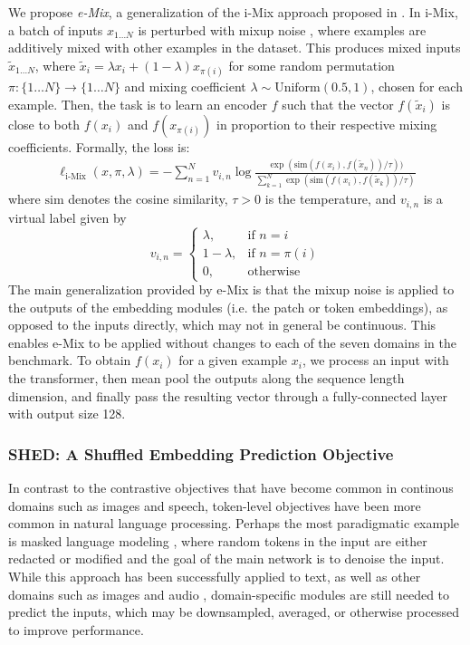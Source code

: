 \documentclass{article}
\begin{document}
We propose \emph{e-Mix}, a generalization of the i-Mix approach proposed in \citet{Lee2021iMIXAD}. In i-Mix, a batch of inputs $x_{1 \ldots N}$ is perturbed with mixup noise \citep{Zhang2018mixupBE}, where examples are additively mixed with other examples in the dataset. This produces mixed inputs $\tilde x_{1 \ldots N}$, where $\tilde x_{i} = \lambda x_i + (1 - \lambda) x_{\pi(i)}$ for some random permutation $\pi : \{1 \ldots N\} \rightarrow \{1 \ldots N\}$ and mixing coefficient $\lambda \sim \textrm{Uniform}(0.5, 1)$, chosen for each example. Then, the task is to learn an encoder $f$ such that the vector $f(\tilde x_i)$ is close to both $f(x_i)$ and $f(x_{\pi(i)})$ in proportion to their respective mixing coefficients. Formally, the loss is:
\begin{align}
    \ell_{\textrm{i-Mix}}(x, \pi, \lambda) = 
    - \sum_{n=1}^{N} v_{i,n} \log \frac
    {\exp(\text{sim}(f(x_i), f(\tilde x_n)) / \tau))}
    {\sum_{k=1}^N \exp(\text{sim}(f(x_i),  f(\tilde x_k)) / \tau)}
\end{align}
where $\text{sim}$ denotes the cosine similarity, $\tau > 0$ is the temperature, and $v_{i,n}$ is a virtual label given by \begin{equation}
    v_{i,n}=
    \begin{cases}
      \lambda, & \text{if } n=i \\
      1-\lambda, & \text{if } n=\pi(i) \\
      0, & \text{otherwise}
    \end{cases}
  \end{equation}
 The main generalization provided by e-Mix is that the mixup noise is applied to the outputs of the embedding modules (i.e. the patch or token embeddings), as opposed to the inputs directly, which may not in general be continuous. This enables e-Mix to be applied without changes to each of the seven domains in the benchmark. To obtain $f(x_i)$ for a given example $x_i$, we process an input with the transformer, then mean pool the outputs along the sequence length dimension, and finally pass the resulting vector through a fully-connected layer with output size 128.

\subsubsection{SHED: A Shuffled Embedding Prediction Objective}

In contrast to the contrastive objectives that have become common in continous domains such as images and speech, token-level objectives have been more common in natural language processing. Perhaps the most paradigmatic example is masked language modeling \citep{Devlin2019BERTPO}, where random tokens in the input are either redacted or modified and the goal of the main network is to denoise the input. While this approach has been successfully applied to text, as well as other domains such as images \citep{Dosovitskiy2020AnII} and audio \citep{Liu2020MockingjayUS}, domain-specific modules are still needed to predict the inputs, which may be downsampled, averaged, or otherwise processed to improve performance.
\end{document}
